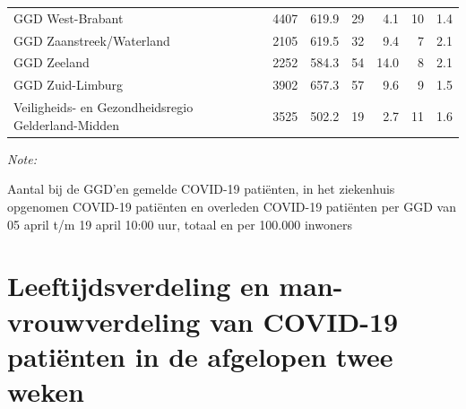 \documentclass[
  english,
  man,floatsintext]{apa6}
\begin{document}
\begin{table}
\begin{threeparttable}
\begin{tabular}{lrrrrrr}
GGD West-Brabant & 4407 & 619.9 & 29 & 4.1 & 10 & 1.4\\
GGD Zaanstreek/Waterland & 2105 & 619.5 & 32 & 9.4 & 7 & 2.1\\
GGD Zeeland & 2252 & 584.3 & 54 & 14.0 & 8 & 2.1\\
GGD Zuid-Limburg & 3902 & 657.3 & 57 & 9.6 & 9 & 1.5\\
Veiligheids- en Gezondheidsregio Gelderland-Midden & 3525 & 502.2 & 19 & 2.7 & 11 & 1.6\\
\bottomrule
\end{tabular}
\begin{tablenotes}
\item \textit{Note: } 
\item Aantal bij de GGD’en gemelde COVID-19 patiënten, in het ziekenhuis opgenomen COVID-19 patiënten en overleden COVID-19 patiënten per GGD van 05 april t/m 19 april 10:00 uur, totaal en per 100.000 inwoners
\end{tablenotes}
\end{threeparttable}
\endgroup{}
\end{table}

\newpage

\hypertarget{leeftijdsverdeling-en-man-vrouwverdeling-van-covid-19-patiuxebnten-in-de-afgelopen-twee-weken}{%
\section{Leeftijdsverdeling en man-vrouwverdeling van COVID-19 patiënten in de afgelopen twee weken}\label{leeftijdsverdeling-en-man-vrouwverdeling-van-covid-19-patiuxebnten-in-de-afgelopen-twee-weken}}
\end{document}
